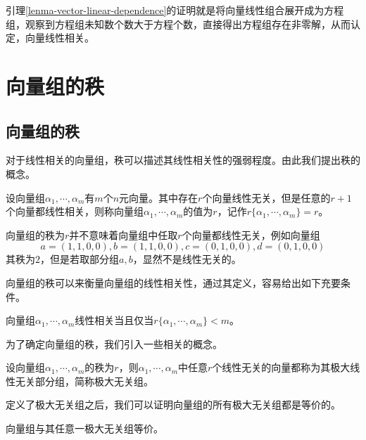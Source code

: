 引理\ref{lenma-vector-linear-dependence}的证明就是将向量线性组合展开成为方程组，观察到方程组未知数个数大于方程个数，直接得出方程组存在非零解，从而认定，向量线性相关。

\section{向量组的秩}

\subsection{向量组的秩}

对于线性相关的向量组，秩可以描述其线性相关性的强弱程度。由此我们提出秩的概念。

\begin{definition}
    \label{def-vector-group-rank}
    设向量组$\alpha_1,\cdots,\alpha_m$有$m$个$n$元向量。其中存在$r$个向量线性无关，但是任意的$r+1$个向量都线性相关，则称向量组$\alpha_1,\cdots,\alpha_m$的值为$r$，记作$r\{\alpha_1,\cdots,\alpha_m\}=r$。
\end{definition}

\begin{remark}
    向量组的秩为$r$并不意味着向量组中任取$r$个向量都线性无关，例如向量组
    \[
        a=(1,1,0,0),b=(1,1,0,0),c=(0,1,0,0),d=(0,1,0,0)
    \]
    其秩为$2$，但是若取部分组$a,b$，显然不是线性无关的。
\end{remark}

向量组的秩可以来衡量向量组的线性相关性，通过其定义，容易给出如下充要条件。

\begin{thm}
    \label{thm-vector-group-dependence-rank}
    向量组$\alpha_1,\cdots,\alpha_m$线性相关当且仅当$r\{\alpha_1,\cdots,\alpha_m\}<m$。
\end{thm}

为了确定向量组的秩，我们引入一些相关的概念。

\begin{definition}
    \label{def-max-independence-group}
    设向量组$\alpha_1,\cdots,\alpha_m$的秩为$r$，则$\alpha_1,\cdots,\alpha_m$中任意$r$个线性无关的向量都称为其极大线性无关部分组，简称极大无关组。
\end{definition}

定义了极大无关组之后，我们可以证明向量组的所有极大无关组都是等价的。

\begin{property}
    \label{property-equvilent-mig}
    向量组与其任意一极大无关组等价。
\end{property}

